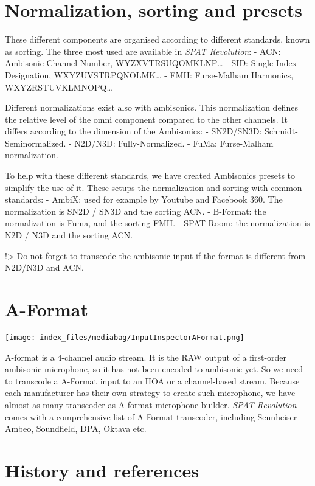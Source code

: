 \documentclass[
  letterpaper,
  DIV=11,
  numbers=noendperiod]{scrreport}
\begin{document}
\hypertarget{normalization-sorting-and-presets}{%
\section{Normalization, sorting and
presets}\label{normalization-sorting-and-presets}}

These different components are organised according to different
standards, known as sorting. The three most used are available in
\emph{SPAT Revolution}: - ACN: Ambisonic Channel Number,
WYZXVTRSUQOMKLNP\ldots{} - SID: Single Index Designation,
WXYZUVSTRPQNOLMK\ldots{} - FMH: Furse-Malham Harmonics,
WXYZRSTUVKLMNOPQ\ldots{}

Different normalizations exist also with ambisonics. This normalization
defines the relative level of the omni component compared to the other
channels. It differs according to the dimension of the Ambisonics: -
SN2D/SN3D: Schmidt-Seminormalized. - N2D/N3D: Fully-Normalized. - FuMa:
Furse-Malham normalization.

To help with these different standards, we have created Ambisonics
presets to simplify the use of it. These setups the normalization and
sorting with common standards: - AmbiX: used for example by Youtube and
Facebook 360. The normalization is SN2D / SN3D and the sorting ACN. -
B-Format: the normalization is Fuma, and the sorting FMH. - SPAT Room:
the normalization is N2D / N3D and the sorting ACN.

!\textgreater{} Do not forget to transcode the ambisonic input if the
format is different from N2D/N3D and ACN.

\hypertarget{a-format}{%
\section{A-Format}\label{a-format}}

\texttt{[image: index\_files/mediabag/InputInspectorAFormat.png]}

A-format is a 4-channel audio stream. It is the RAW output of a
first-order ambisonic microphone, so it has not been encoded to
ambisonic yet. So we need to transcode a A-Format input to an HOA or a
channel-based stream. Because each manufacturer has their own strategy
to create such microphone, we have almost as many transcoder as A-format
microphone builder. \emph{SPAT Revolution} comes with a comprehensive
list of A-Format transcoder, including Sennheiser Ambeo, Soundfield,
DPA, Oktava etc.

\hypertarget{history-and-references}{%
\section{History and references}\label{history-and-references}}
\end{document}

